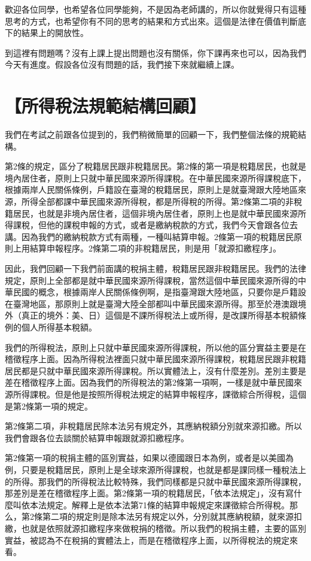 \documentclass[]{ctexbook}
\begin{document}
歡迎各位同學，也希望各位同學能夠，不是因為老師講的，所以你就覺得只有這種思考的方式，也希望你有不同的思考的結果和方式出來。這個是法律在價值判斷底下的結果上的開放性。

到這裡有問題嗎？沒有上課上提出問題也沒有關係，你下課再來也可以，因為我們今天有進度。假設各位沒有問題的話，我們接下來就繼續上課。

\hypertarget{ux6240ux5f97ux7a05ux6cd5ux898fux7bc4ux7d50ux69cbux56deux9867}{%
\section{【所得稅法規範結構回顧】}\label{ux6240ux5f97ux7a05ux6cd5ux898fux7bc4ux7d50ux69cbux56deux9867}}

我們在考試之前跟各位提到的，我們稍微簡單的回顧一下，我們整個法條的規範結構。

第2條的規定，區分了稅籍居民跟非稅籍居民。第2條的第一項是稅籍居民，也就是境內居住者，原則上只就中華民國來源所得課稅。在中華民國來源所得課稅底下，根據兩岸人民關係條例，戶籍設在臺灣的稅籍居民，原則上是就臺灣跟大陸地區來源，所得全部都課中華民國來源所得稅，都是所得稅的所得。第2條第二項的非稅籍居民，也就是非境內居住者，這個非境內居住者，原則上也是就中華民國來源所得課稅，但他的課稅申報的方式，或者是繳納稅款的方式，我們今天會跟各位去講。因為我們的繳納稅款方式有兩種，一種叫結算申報。2條第一項的稅籍居民原則上用結算申報程序。2條第二項的非稅籍居民，則是用「就源扣繳程序」。

因此，我們回顧一下我們前面講的稅捐主體，稅籍居民跟非稅籍居民。我們的法律規定，原則上全部都是就中華民國來源所得課稅，當然這個中華民國來源所得的中華民國的概念，根據兩岸人民關係條例啊，是指臺灣跟大陸地區，只要你是戶籍設在臺灣地區，那原則上就是臺灣大陸全部都叫中華民國來源所得。那至於港澳跟境外（真正的境外：美、日）這個是不課所得稅法上或所得，是改課所得基本稅額條例的個人所得基本稅額。

我們的所得稅法，原則上只就中華民國來源所得課稅，所以他的區分實益主要是在稽徵程序上面。因為所得稅法裡面只就中華民國來源所得課稅，稅籍居民跟非稅籍居民都是只就中華民國來源所得課稅。所以實體法上，沒有什麼差別。差別主要是差在稽徵程序上面。因為我們的所得稅法的第2條第一項啊，一樣是就中華民國來源所得課稅。但是他是按照所得稅法規定的結算申報程序，課徵綜合所得稅，這個是第2條第一項的規定。

第2條第二項，非稅籍居民除本法另有規定外，其應納稅額分別就來源扣繳。所以我們會跟各位去談關於結算申報跟就源扣繳程序。

第2條第一項的稅捐主體的區別實益，如果以德國跟日本為例，或者是以美國為例，只要是稅籍居民，原則上是全球來源所得課稅，也就是都是課同樣一種稅法上的所得。那我們的所得稅法比較特殊，我們同樣都是只就中華民國來源所得課稅，那差別是差在稽徵程序上面。第2條第一項的稅籍居民，「依本法規定」，沒有寫什麼叫依本法規定。解釋上是依本法第71條的結算申報規定來課徵綜合所得稅。那么，第2條第二項的規定則是除本法另有規定以外，分別就其應納稅額，就來源扣繳，也就是依照就源扣繳程序來做稅捐的稽徵。所以我們的稅捐主體，主要的區別實益，被認為不在稅捐的實體法上，而是在稽徵程序上面，以所得稅法的規定來看。
\end{document}
